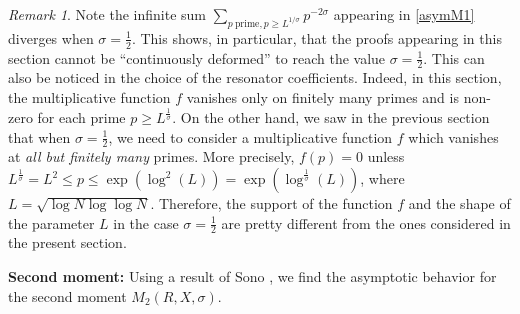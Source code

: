 \documentclass[10pt,a4paper]{amsart}
\theoremstyle{plain}
\theoremstyle{definition}
\theoremstyle{remark}
\newtheorem{remark}[theorem]{Remark}
\begin{document}
\begin{remark}
    Note the infinite sum $\sum_{p \ \text{prime}, p \geq L^{1/\sigma}} p^{-2 \sigma}$ appearing in \eqref{asymM1} diverges when $\sigma = \frac{1}{2}$.
    This shows, in particular, that the proofs appearing in this section cannot be ``continuously deformed'' to reach the value $\sigma = \frac{1}{2}$. This can also be noticed in the choice of the resonator coefficients. Indeed, in this section, the multiplicative function $f$ vanishes only on finitely many primes and is non-zero for each prime $p \geq L^{\frac{1}{\sigma}}$. On the other hand, we saw in the previous section that when $\sigma = \frac{1}{2}$, we need to consider a multiplicative function $f$ which vanishes at \textit{all but finitely many} primes. More precisely, $f(p) = 0$ unless $L^{\frac{1}{\sigma}} = L^2 \leq p \leq \exp(\log^2(L)) = \exp(\log^{\frac{1}{\sigma}}(L))$, where $L = \sqrt{\log N \log\log N}$. Therefore, the support of the function $f$ and the shape of the parameter $L$ in the case $\sigma = \frac{1}{2}$ are pretty different from the ones considered in the present section.
\end{remark}
\textbf{Second moment:} Using a result of Sono \cite{sono2020second}, we find the asymptotic behavior for the second moment $M_2(R,X,\sigma)$.
\end{document}
